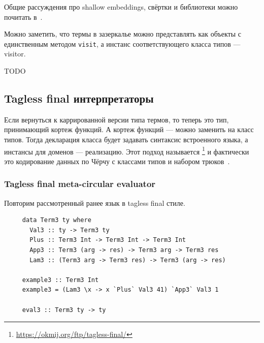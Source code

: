 Общие рассуждения про shallow embeddings, свёртки и библиотеки можно почитать в~\cite{gibbons2013functional, gibbons2014folding}.

Можно заметить, что термы в зазеркалье можно представлять как объекты с единственным методом \texttt{visit}, а инстанс соответствующего класса типов --- visitor.


TODO %


\subsection{Tagless final интерпретаторы}

Если вернуться к каррированной версии типа термов, то теперь это тип, принимающий кортеж функций.
А кортеж функций --- можно заменить на класс типов.
Тогда декларация класса будет задавать синтаксис встроенного языка, а инстансы для доменов --- реализацию.
Этот подход называется \footnote{\url{https://okmij.org/ftp/tagless-final/}} и фактически это кодирование данных по Чёрчу с классами типов и набором трюков~\cite{carette2007finally, kiselyov2012typed}.

\subsubsection{Tagless final meta-circular evaluator}

Повторим рассмотренный ранее язык в tagless final стиле.

\begin{verbatim}
     data Term3 ty where
       Val3 :: ty -> Term3 ty
       Plus :: Term3 Int -> Term3 Int -> Term3 Int
       App3 :: Term3 (arg -> res) -> Term3 arg -> Term3 res
       Lam3 :: (Term3 arg -> Term3 res) -> Term3 (arg -> res)

     example3 :: Term3 Int
     example3 = (Lam3 \x -> x `Plus` Val3 41) `App3` Val3 1

     eval3 :: Term3 ty -> ty
\end{verbatim}

